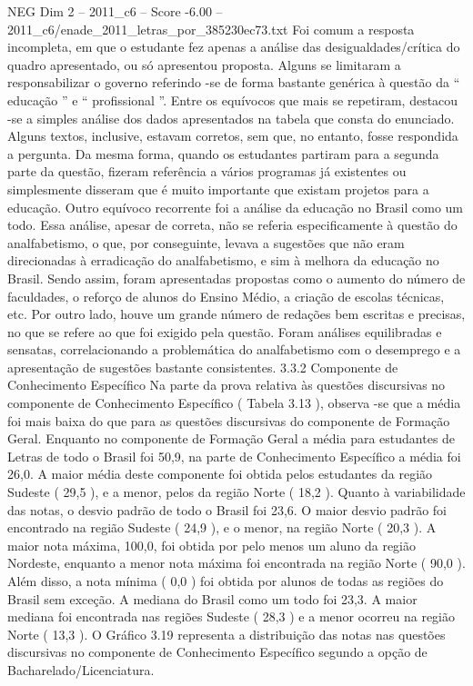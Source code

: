 \begin{textsample}{NEG Dim 2 – 2011\_c6 – Score -6.00 – 2011\_c6/enade\_2011\_letras\_por\_385230ec73.txt}
Foi comum a resposta incompleta, em que o estudante fez apenas a análise das desigualdades/crítica do quadro apresentado, ou só apresentou proposta.
Alguns se limitaram a responsabilizar o governo referindo -se de forma bastante genérica à questão da “ educação ” e “ profissional ”.
Entre os equívocos que mais se repetiram, destacou -se a simples análise dos dados apresentados na tabela que consta do enunciado.
Alguns textos, inclusive, estavam corretos, sem que, no entanto, fosse respondida a pergunta.
Da mesma forma, quando os estudantes partiram para a segunda parte da questão, fizeram referência a vários programas já existentes ou simplesmente disseram que é muito importante que existam projetos para a educação.
Outro equívoco recorrente foi a análise da educação no Brasil como um todo.
Essa análise, apesar de correta, não se referia especificamente à questão do analfabetismo, o que, por conseguinte, levava a sugestões que não eram direcionadas à erradicação do analfabetismo, e sim à melhora da educação no Brasil.
Sendo assim, foram apresentadas propostas como o aumento do número de faculdades, o reforço de alunos do Ensino Médio, a criação de escolas técnicas, etc.
Por outro lado, houve um grande número de redações bem escritas e precisas, no que se refere ao que foi exigido pela questão.
Foram análises equilibradas e sensatas, correlacionando a problemática do analfabetismo com o desemprego e a apresentação de sugestões bastante consistentes. 3.3.2 Componente de Conhecimento Específico Na parte da prova relativa às questões discursivas no componente de Conhecimento Específico ( Tabela 3.13 ), observa -se que a média foi mais baixa do que para as questões discursivas do componente de Formação Geral.
Enquanto no componente de Formação Geral a média para estudantes de Letras de todo o Brasil foi 50,9, na parte de Conhecimento Específico a média foi 26,0.
A maior média deste componente foi obtida pelos estudantes da região Sudeste ( 29,5 ), e a menor, pelos da região Norte ( 18,2 ).
Quanto à variabilidade das notas, o desvio padrão de todo o Brasil foi 23,6.
O maior desvio padrão foi encontrado na região Sudeste ( 24,9 ), e o menor, na região Norte ( 20,3 ).
A maior nota máxima, 100,0, foi obtida por pelo menos um aluno da região Nordeste, enquanto a menor nota máxima foi encontrada na região Norte ( 90,0 ).
Além disso, a nota mínima ( 0,0 ) foi obtida por alunos de todas as regiões do Brasil sem exceção.
A mediana do Brasil como um todo foi 23,3.
A maior mediana foi encontrada nas regiões Sudeste ( 28,3 ) e a menor ocorreu na região Norte ( 13,3 ).
O Gráfico 3.19 representa a distribuição das notas nas questões discursivas no componente de Conhecimento Específico segundo a opção de Bacharelado/Licenciatura.

\end{textsample}
